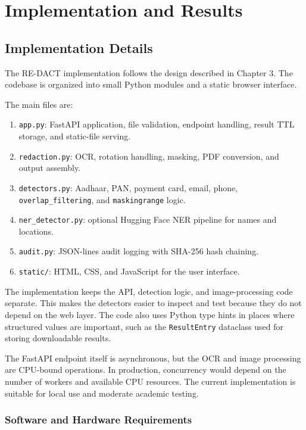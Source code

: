 \chapter{Implementation and Results}
\section{Implementation Details}

The RE-DACT implementation follows the design described in Chapter 3. The codebase is organized into small Python modules and a static browser interface.

The main files are:

\begin{enumerate}
    \item \texttt{app.py}: FastAPI application, file validation, endpoint handling, result TTL storage, and static-file serving.
    \item \texttt{redaction.py}: OCR, rotation handling, masking, PDF conversion, and output assembly.
    \item \texttt{detectors.py}: Aadhaar, PAN, payment card, email, phone, \texttt{overlap\_filtering}, and \texttt{masking\-range} logic.
    \item \texttt{ner\_detector.py}: optional Hugging Face NER pipeline for names and locations.
    \item \texttt{audit.py}: JSON-lines audit logging with SHA-256 hash chaining.
    \item \texttt{static/}: HTML, CSS, and JavaScript for the user interface.
\end{enumerate}

The implementation keeps the API, detection logic, and image-processing code separate. This makes the detectors easier to inspect and test because they do not depend on the web layer. The code also uses Python type hints in places where structured values are important, such as the \texttt{ResultEntry} dataclass used for storing downloadable results.

The FastAPI endpoint itself is asynchronous, but the OCR and image processing are CPU-bound operations. In production, concurrency would depend on the number of workers and available CPU resources. The current implementation is suitable for local use and moderate academic testing.

\subsection{Software and Hardware Requirements}

